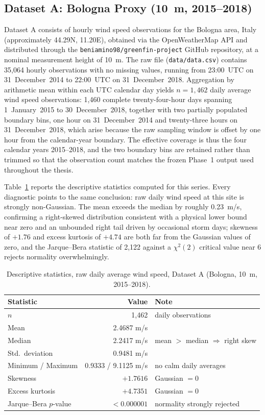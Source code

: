 ﻿\documentclass[11pt, a4paper, twoside]{article}
\begin{document}
\subsection{Dataset A: Bologna Proxy (10~m, 2015--2018)}
\label{sec:data-a}

Dataset A consists of hourly wind speed observations for the Bologna area, Italy (approximately 44.29\textdegree{}N, 11.20\textdegree{}E), obtained via the OpenWeatherMap API and distributed through the \texttt{beniamino98/greenfin-project} GitHub repository, at a nominal measurement height of 10~m. The raw file (\texttt{data/data.csv}) contains 35{,}064 hourly observations with no missing values, running from 23:00~UTC on 31~December~2014 to 22:00~UTC on 31~December~2018. Aggregation by arithmetic mean within each UTC calendar day yields $n = 1{,}462$ daily average wind speed observations: 1{,}460 complete twenty-four-hour days spanning 1~January~2015 to 30~December~2018, together with two partially populated boundary bins, one hour on 31~December~2014 and twenty-three hours on 31~December~2018, which arise because the raw sampling window is offset by one hour from the calendar-year boundary. The effective coverage is thus the four calendar years 2015--2018, and the two boundary bins are retained rather than trimmed so that the observation count matches the frozen Phase~1 output used throughout the thesis.

Table~\ref{tab:desc-a} reports the descriptive statistics computed for this series. Every diagnostic points to the same conclusion: raw daily wind speed at this site is strongly non-Gaussian. The mean exceeds the median by roughly 0.23~m/s, confirming a right-skewed distribution consistent with a physical lower bound near zero and an unbounded right tail driven by occasional storm days; skewness of $+1.76$ and excess kurtosis of $+4.74$ are both far from the Gaussian values of zero, and the Jarque--Bera statistic of 2{,}122 against a $\chi^2(2)$ critical value near 6 rejects normality overwhelmingly.

\begin{table}[htbp]
\centering
\caption{Descriptive statistics, raw daily average wind speed, Dataset A (Bologna, 10~m, 2015--2018).}
\label{tab:desc-a}
\begin{tabular}{lrl}
\toprule
\textbf{Statistic} & \textbf{Value} & \textbf{Note} \\
\midrule
$n$ & 1{,}462 & daily observations \\
Mean & 2.4687 m/s & \\
Median & 2.2417 m/s & mean $>$ median $\Rightarrow$ right skew \\
Std.\ deviation & 0.9481 m/s & \\
Minimum / Maximum & 0.9333 / 9.1125 m/s & no calm daily averages \\
Skewness & $+1.7616$ & Gaussian $= 0$ \\
Excess kurtosis & $+4.7351$ & Gaussian $= 0$ \\
Jarque--Bera $p$-value & $< 0.000001$ & normality strongly rejected \\
\bottomrule
\end{tabular}
\end{table}
\end{document}
